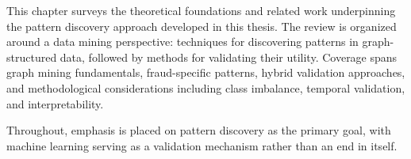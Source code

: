 This chapter surveys the theoretical foundations and related work underpinning the pattern discovery approach developed in this thesis. The review is organized around a data mining perspective: techniques for discovering patterns in graph-structured data, followed by methods for validating their utility. Coverage spans graph mining fundamentals, fraud-specific patterns, hybrid validation approaches, and methodological considerations including class imbalance, temporal validation, and interpretability.

Throughout, emphasis is placed on pattern discovery as the primary goal, with machine learning serving as a validation mechanism rather than an end in itself.
